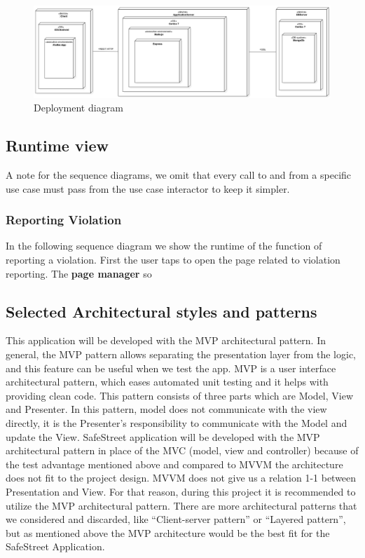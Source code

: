 \begin{figure}
\centering
\includegraphics[width=\textwidth]{Images/DeploymentDiagram1.png}
\caption{\label{fig:deploy} Deployment diagram}
\end{figure}



\subsection{Runtime view}


A note for the sequence diagrams, we omit that every call to and from a specific use case must pass from the use case interactor to keep it simpler. 

\subsubsection{Reporting Violation}

In the following sequence diagram we show the runtime of the function of reporting a violation.
First the user taps to open the page related to violation reporting. The \textbf{page manager} so







\subsection{Selected Architectural styles and patterns}




This application will be developed with the MVP architectural pattern. In general, the MVP pattern allows separating the presentation layer from the logic, and this feature can be useful when we test the app. MVP is a user interface architectural pattern, which eases automated unit testing and it helps with providing clean code. This pattern consists of three parts which are Model, View and Presenter. In this pattern, model does not communicate with the view directly, it is the Presenter’s responsibility to communicate with the Model and update the View. SafeStreet application will be developed with the MVP architectural pattern in place of the MVC (model, view and controller) because of the test advantage mentioned above and compared to MVVM the architecture does not ﬁt to the project design. MVVM does not give us a relation 1-1 between Presentation and View. For that reason, during this project it is recommended to utilize the MVP architectural pattern. There are more architectural patterns that we considered and discarded, like “Client-server pattern” or “Layered pattern”, but as mentioned above the MVP architecture would be the best ﬁt for the SafeStreet Application.

